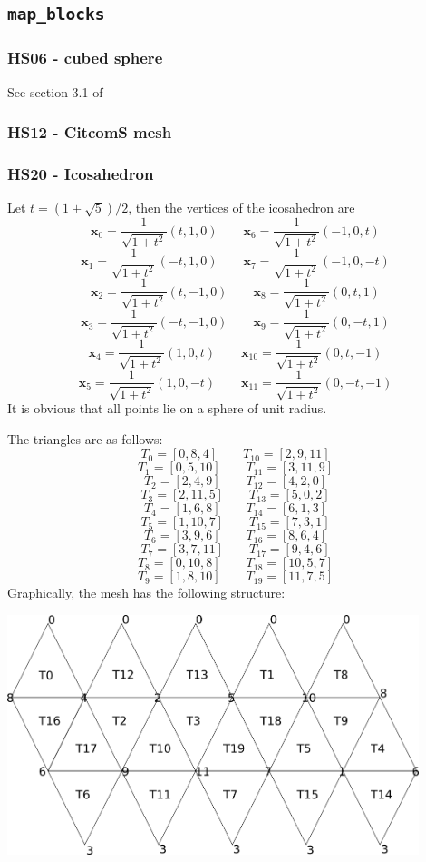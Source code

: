  \subsection{\tt map\_blocks}
 \subsubsection{HS06 - cubed sphere}
 See section 3.1 of \cite{puli07}
 \subsubsection{HS12 - CitcomS mesh}
 \subsubsection{HS20 - Icosahedron}
 Let $t=(1+\sqrt{5})/2$, then the vertices of the icosahedron are 
 \[
 {\bm x}_0=\frac{1}{\sqrt{1+t^2}}(t,1,0) \quad\quad {\bm x}_6=\frac{1}{\sqrt{1+t^2}}(-1,0,t)
 \]
 \[
 {\bm x}_1=\frac{1}{\sqrt{1+t^2}}(-t,1,0) \quad\quad {\bm x}_7=\frac{1}{\sqrt{1+t^2}}(-1,0,-t)
 \]
 \[
 {\bm x}_2=\frac{1}{\sqrt{1+t^2}}(t,-1,0) \quad\quad {\bm x}_8=\frac{1}{\sqrt{1+t^2}}(0,t,1)
 \]
 \[
 {\bm x}_3=\frac{1}{\sqrt{1+t^2}}(-t,-1,0) \quad\quad {\bm x}_9=\frac{1}{\sqrt{1+t^2}}(0,-t,1)
 \]
 \[
 {\bm x}_4=\frac{1}{\sqrt{1+t^2}}(1,0,t) \quad\quad {\bm x}_{10}=\frac{1}{\sqrt{1+t^2}}(0,t,-1)
 \]
 \[
 {\bm x}_5=\frac{1}{\sqrt{1+t^2}}(1,0,-t) \quad\quad {\bm x}_{11}=\frac{1}{\sqrt{1+t^2}}(0,-t,-1)
 \]
 It is obvious that all points lie on a sphere of unit radius.

 The triangles are as follows:
 \[  T_0=[0,8,4]  \quad\quad T_{10}=[2,9,11]   \]
 \[  T_1=[0,5,10] \quad\quad T_{11}=[3,11,9]   \]
 \[  T_2=[2,4,9]  \quad\quad T_{12}=[4,2,0]   \]
 \[  T_3=[2,11,5] \quad\quad T_{13}=[5,0,2]   \]
 \[  T_4=[1,6,8]  \quad\quad T_{14}=[6,1,3]   \]
 \[  T_5=[1,10,7] \quad\quad T_{15}=[7,3,1]   \]
 \[  T_6=[3,9,6]  \quad\quad T_{16}=[8,6,4]   \]
 \[  T_7=[3,7,11] \quad\quad T_{17}=[9,4,6]   \]
 \[  T_8=[0,10,8] \quad\quad T_{18}=[10,5,7]   \]
 \[  T_9=[1,8,10] \quad\quad T_{19}=[11,7,5]   \]
 Graphically, the mesh has the following structure:
 \begin{center}
 \includegraphics[width=12cm]{images/flat_icosahedron}
 \end{center}
